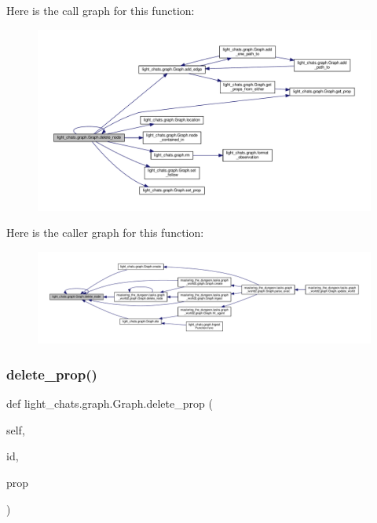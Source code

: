 Here is the call graph for this function\+:
\nopagebreak
\begin{figure}[H]
\begin{center}
\leavevmode
\includegraphics[width=350pt]{classlight__chats_1_1graph_1_1Graph_a703188eb5340371b8ad793ddebd2af30_cgraph}
\end{center}
\end{figure}
Here is the caller graph for this function\+:
\nopagebreak
\begin{figure}[H]
\begin{center}
\leavevmode
\includegraphics[width=350pt]{classlight__chats_1_1graph_1_1Graph_a703188eb5340371b8ad793ddebd2af30_icgraph}
\end{center}
\end{figure}
\mbox{\label{classlight__chats_1_1graph_1_1Graph_ac98ed988f74d9571e195aa9592f84b76}} 
\subsubsection{\texorpdfstring{delete\+\_\+prop()}{delete\_prop()}}
{\footnotesize\ttfamily def light\+\_\+chats.\+graph.\+Graph.\+delete\+\_\+prop (\begin{DoxyParamCaption}\item[{}]{self,  }\item[{}]{id,  }\item[{}]{prop }\end{DoxyParamCaption})}

